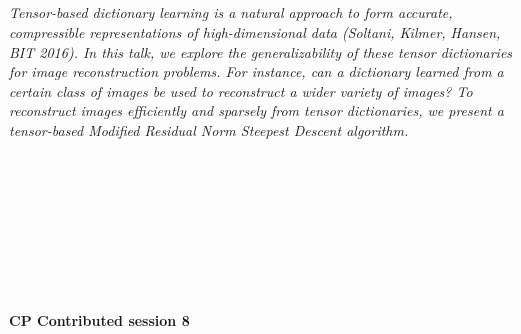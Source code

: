 \begin{multicols}{2}
        \\
        \\\\
\\
      \textit{Tensor-based dictionary learning is a natural approach to form accurate, compressible representations of high-dimensional data (Soltani, Kilmer, Hansen, BIT 2016).  In this talk, we explore the generalizability of these tensor dictionaries for image reconstruction problems.  For instance, can a dictionary learned from a certain class of images be used to reconstruct a wider variety of images?  To reconstruct images efficiently and sparsely from tensor dictionaries, we present a tensor-based Modified Residual Norm Steepest Descent algorithm.}\\
\\ 
        \\
        \\\\
        \\
        \\\\
\\
\end{multicols}
  \noindent\textbf{CP Contributed session 8}\\
  \textit{} \\
    
